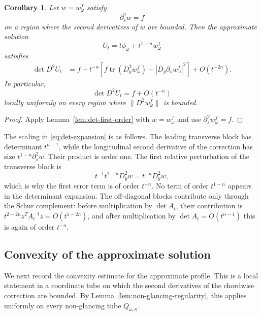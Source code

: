 \documentclass[11pt]{article}
\numberwithin{equation}{section}
\newtheorem{corollary}[theorem]{Corollary}
\newcommand{\tr}{\operatorname{tr}}
\begin{document}
\begin{corollary}\label{cor:approx-source-equation}
Let \(w=w_\omega^f\) satisfy
\[
    \partial_s^2w=f
\]
on a region where the second derivatives of \(w\) are bounded.  Then the approximate solution
\[
    U_t=t\phi_\omega+t^{1-n}w_\omega^f
\]
satisfies
\begin{equation}\label{eq:approx-source}
\begin{aligned}
    \det D^2U_t
    &=
    f
    +
    t^{-n}\left[
        f\tr(D_y^2w_\omega^f)
        -
        |D_y\partial_s w_\omega^f|^2
    \right]
    +O(t^{-2n}).
\end{aligned}
\end{equation}
In particular,
\begin{equation}\label{eq:approx-source-short}
    \det D^2U_t=f+O(t^{-n})
\end{equation}
locally uniformly on every region where \(\|D^2w_\omega^f\|\) is bounded.
\end{corollary}

\begin{proof}
Apply Lemma~\ref{lem:det-first-order} with \(w=w_\omega^f\) and use \(\partial_s^2w_\omega^f=f\).
\end{proof}

The scaling in \eqref{eq:det-expansion} is as follows.  The leading transverse block has determinant \(t^{n-1}\), while the longitudinal second derivative of the correction has size \(t^{1-n}\partial_s^2w\).  Their product is order one.  The first relative perturbation of the transverse block is
\[
    t^{-1}t^{1-n}D_y^2w=t^{-n}D_y^2w,
\]
which is why the first error term is of order \(t^{-n}\).  No term of order \(t^{1-n}\) appears in the determinant expansion.  The off-diagonal blocks contribute only through the Schur complement: before multiplication by \(\det A_t\), their contribution is \(t^{2-2n}z^TA_t^{-1}z=O(t^{1-2n})\), and after multiplication by \(\det A_t=O(t^{n-1})\) this is again of order \(t^{-n}\).


\subsection{Convexity of the approximate solution}\label{subsec:convexity-approximate-solutions}

We next record the convexity estimate for the approximate profile.  This is a local statement in a coordinate tube on which the second derivatives of the chordwise correction are bounded.  By Lemma~\ref{lem:non-glancing-regularity}, this applies uniformly on every non-glancing tube \(Q_{\omega,\kappa}\).
\end{document}
